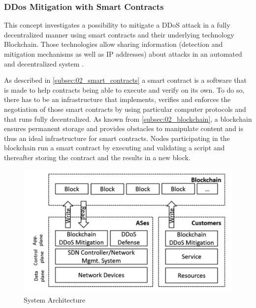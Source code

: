 \subsubsection{DDos Mitigation with Smart Contracts}
This concept investigates a possibility to mitigate a DDoS attack in a fully decentralized manner using smart contracts and their underlying technology Blockchain. Those technologies allow sharing information (detection and mitigation mechanisms as well as IP addresses) about attacks in an automated and decentralized system \cite{Rodrigues2017}.

As described in \ref{subsec:02_smart_contracts} a smart contract is a software that is made to help contracts being able to execute and verify on its own. To do so, there has to be an infrastructure that implements, verifies and enforces the negotiation of those smart contracts by using particular computer protocols and that runs fully decentralized. As known from \ref{subsec:02_blockchain}, a blockchain ensures permanent storage and provides obstacles to manipulate content and is thus an ideal infrastructure for smart contracts. Nodes participating in the blockchain run a smart contract by executing and validating a script and thereafter storing the contract and the results in a new block.

\begin{figure}[ht]
  \begin{center}
  \includegraphics[scale=0.6]{Talk7/img/ddos/collaborative_ddos_mitigation_system_architecture}
  \end{center}
  \caption{System Architecture}
  \label{system_architecture}
\end{figure}


